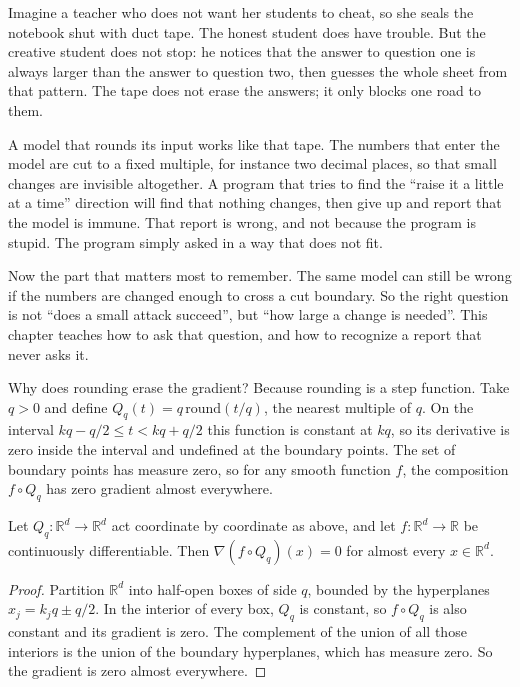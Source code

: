 \begin{untukanak}
Imagine a teacher who does not want her students to cheat, so she seals the notebook shut with duct
tape. The honest student does have trouble. But the creative student does not stop: he notices that
the answer to question one is always larger than the answer to question two, then guesses the whole
sheet from that pattern. The tape does not erase the answers; it only blocks one road to them.

A model that rounds its input works like that tape. The numbers that enter the model are cut to a
fixed multiple, for instance two decimal places, so that small changes are invisible altogether. A
program that tries to find the ``raise it a little at a time'' direction will find that nothing
changes, then give up and report that the model is immune. That report is wrong, and not because the
program is stupid. The program simply asked in a way that does not fit.

Now the part that matters most to remember. The same model can still be wrong if the numbers are
changed enough to cross a cut boundary. So the right question is not ``does a small attack succeed'',
but ``how large a change is needed''. This chapter teaches how to ask that question, and how to
recognize a report that never asks it.
\end{untukanak}

Why does rounding erase the gradient? Because rounding is a step function. Take
$q>0$ and define $Q_q(t)=q\,\mathrm{round}(t/q)$, the nearest multiple of $q$. On
the interval $kq-q/2 \le t < kq+q/2$ this function is constant at $kq$, so its derivative is zero
inside the interval and undefined at the boundary points. The set of boundary points has measure
zero, so for any smooth function $f$, the composition $f\circ Q_q$ has zero gradient almost
everywhere.

\begin{proposisi}
Let $Q_q\colon\mathbb{R}^d\to\mathbb{R}^d$ act coordinate by coordinate as above, and let
$f\colon\mathbb{R}^d\to\mathbb{R}$ be continuously differentiable. Then
$\nabla (f\circ Q_q)(x)=0$ for almost every $x\in\mathbb{R}^d$.
\end{proposisi}

\begin{proof}
Partition $\mathbb{R}^d$ into half-open boxes of side $q$, bounded by the
hyperplanes $x_j=k_jq\pm q/2$. In the interior of every box, $Q_q$ is
constant, so $f\circ Q_q$ is also constant and its gradient is zero. The complement of the union of
all those interiors is the union of the boundary hyperplanes, which has measure zero. So the
gradient is zero almost everywhere.
\end{proof}

